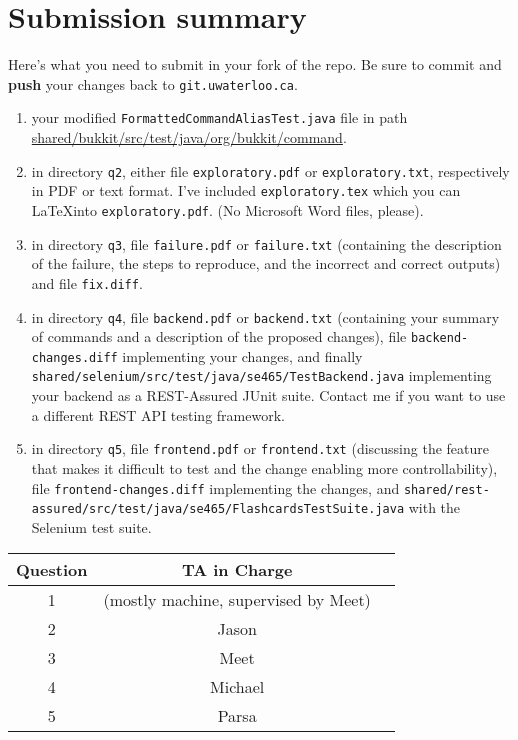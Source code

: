 \documentclass[10pt,hidelinks]{article}
\begin{document}
\section*{Submission summary}
Here's what you need to submit in your fork of the repo. Be sure to commit
and {\bf push} your changes back to {\tt git.uwaterloo.ca}.
\begin{enumerate}
\item your modified {\tt FormattedCommandAliasTest.java} file in path
\url{shared/bukkit/src/test/java/org/bukkit/command}.
\item in directory {\tt q2}, either file {\tt exploratory.pdf} or {\tt exploratory.txt}, respectively
in PDF or text format. I've included {\tt exploratory.tex} which you can
\LaTeX into {\tt exploratory.pdf}. (No Microsoft Word files, please).
\item in directory {\tt q3}, file {\tt failure.pdf} or {\tt failure.txt} (containing the description of the failure, the steps to reproduce, and the incorrect and correct outputs) and file {\tt fix.diff}.
\item in directory {\tt q4}, file {\tt backend.pdf} or {\tt backend.txt} (containing your summary of commands and a description of the proposed changes), file {\tt backend-changes.diff} implementing your changes, and finally {\tt shared/selenium/src/test/java/se465/TestBackend.java} implementing your backend as a REST-Assured JUnit suite. Contact me if you want to use a different REST API testing framework.
\item in directory {\tt q5}, file {\tt frontend.pdf} or {\tt frontend.txt} (discussing the feature that makes it difficult to test and the change enabling more controllability), file {\tt frontend-changes.diff} implementing the changes, and {\tt shared/rest-assured/src/test/java/se465/FlashcardsTestSuite.java} with the Selenium test suite.
\end{enumerate}
 
 \begin{center}
 \begin{tabular}{c|cc}
 Question   &  TA in Charge \\ \hline
1 & (mostly machine, supervised by Meet) \\ 
2 & Jason \\ 
3 & Meet \\ 
4 & Michael \\
5 & Parsa
 \end{tabular}
 \end{center}
\end{document}
